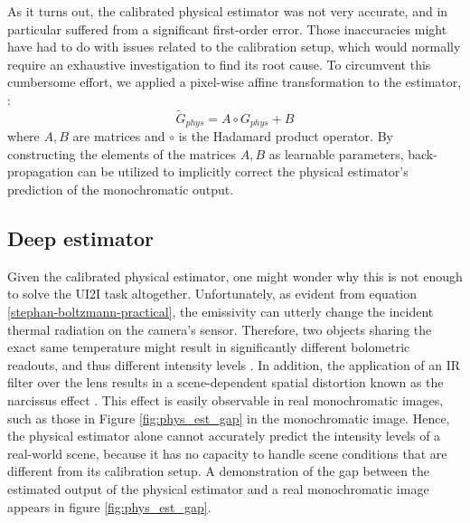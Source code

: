 As it turns out, the calibrated physical estimator was not very accurate, and in particular suffered from a significant first-order error.
Those inaccuracies might have had to do with issues related to the calibration setup, which would normally require an exhaustive investigation to find its root cause.
To circumvent this cumbersome effort, we applied a pixel-wise affine transformation to the estimator, \ie: 
\begin{equation}
  \tilde{G}_{\mathit{phys}} = A \circ G_{\mathit{phys}} + B
\end{equation}
where $A, B$ are matrices and $\circ$ is the Hadamard product operator.
By constructing the elements of the matrices $A, B$ as learnable parameters, back-propagation can be utilized to implicitly correct the physical estimator's prediction of the monochromatic output.


\subsection{Deep estimator}
Given the calibrated physical estimator, one might wonder why this is not enough to solve the UI2I task altogether. 
Unfortunately, as evident from equation \ref{stephan-boltzmann-practical}, the emissivity can utterly change the incident thermal radiation on the camera's sensor. 
Therefore, two objects sharing the exact same temperature might result in significantly different bolometric readouts, and thus different intensity levels \cite{holman1989heat}.
In addition, the application of an IR filter over the lens results in a scene-dependent spatial distortion known as the narcissus effect \cite{FundamentalsOfInfraredThermalImaging}.
This effect is easily observable in real monochromatic images, such as those in Figure \ref{fig:phys_est_gap} in the monochromatic image.
Hence, the physical estimator alone cannot accurately predict the intensity levels of a real-world scene, because it has no capacity to handle scene conditions that are different from its calibration setup.
A demonstration of the gap between the estimated output of the physical estimator and a real monochromatic image appears in figure \ref{fig:phys_est_gap}.

